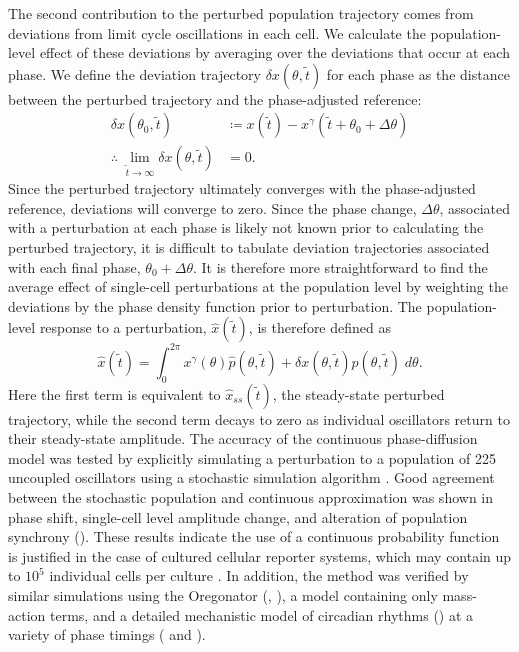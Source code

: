 The second contribution to the perturbed population trajectory comes from deviations from limit cycle oscillations in each cell.
We calculate the population-level effect of these deviations by averaging over the deviations that occur at each phase.
We define the deviation trajectory $\delta x(\theta, \tilde{t})$ for each phase as the distance between the perturbed trajectory and the phase-adjusted reference:
\begin{align}
  \delta x(\theta_0, \tilde{t}) &\coloneqq x(\tilde{t}) - x^\gamma(\tilde{t} + \theta_0 + \Delta \theta) \\
  \therefore\; \lim_{\tilde{t} \to \infty} \delta x(\theta, \tilde{t}) &= 0.
  \label{eq:deviation}
\end{align}
Since the perturbed trajectory ultimately converges with the phase-adjusted reference, deviations will converge to zero.
Since the phase change, $\Delta\theta$, associated with a perturbation at each phase is likely not known prior to calculating the perturbed trajectory, it is difficult to tabulate deviation trajectories associated with each final phase, $\theta_0 + \Delta\theta$.
It is therefore more straightforward to find the average effect of single-cell perturbations at the population level by weighting the deviations by the phase density function prior to perturbation.
The population-level response to a perturbation, $\hat{x}(\tilde{t})$, is therefore defined as
\begin{equation}
  \hat{x}(\tilde{t}) = \int_0^{2\pi} x^\gamma(\theta)\hat{p}(\theta, \tilde{t}) + \delta x(\theta, \tilde{t})p(\theta, \tilde{t}) \; d\theta.
  \label{eq:xhat}
\end{equation}
Here the first term is equivalent to $\hat{x}_{ss}(\tilde{t})$, the steady-state perturbed trajectory, while the second term decays to zero as individual oscillators return to their steady-state amplitude.
The accuracy of the continuous phase-diffusion model was tested by explicitly simulating a perturbation to a population of 225 uncoupled oscillators using a stochastic simulation algorithm \cite{Gillespie1977, Sanft2011a}.
Good agreement between the stochastic population and continuous approximation was shown in phase shift, single-cell level amplitude change, and alteration of population synchrony ().
These results indicate the use of a continuous probability function is justified in the case of cultured cellular reporter systems, which may contain up to $10^5$ individual cells  per culture \cite{Welsh2004}.
In addition, the method was verified by similar simulations using the Oregonator (, \cite{Field1974}), a model containing only mass-action terms, and a detailed mechanistic model of circadian rhythms () at a variety of phase timings ( and ).

